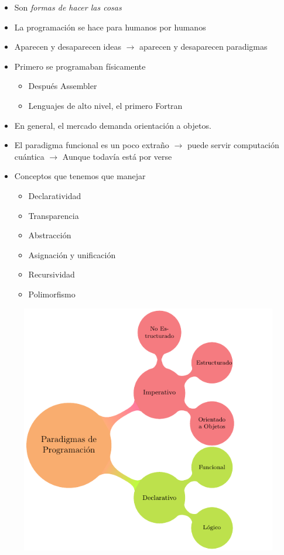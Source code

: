 \begin{itemize}
    \item Son \textit{formas de hacer las cosas}
    \item La programación se hace para humanos por humanos
    \item Aparecen y desaparecen ideas 
    \(\to\) aparecen y desaparecen paradigmas
    \item Primero se programaban físicamente
    \begin{itemize}
        \item Después Assembler 
        \item Lenguajes de alto nivel, el primero Fortran
    \end{itemize}
    \item En general, el mercado demanda orientación a objetos.
    \item El paradigma funcional es un poco extraño 
    \(\to\) puede servir computación cuántica
    \(\to\) Aunque todavía está por verse
    \item Conceptos que tenemos que manejar
    \begin{itemize}
        \item Declaratividad
        \item Transparencia 
        \item Abstracción 
        \item Asignación y unificación 
        \item Recursividad 
        \item Polimorfismo
    \end{itemize}
\end{itemize}

\begin{figure}[H]
    \centering
    \includegraphics[width=.7\textwidth]{img/paradigmas.png}
\end{figure}

